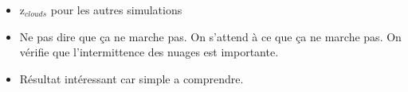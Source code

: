 \documentclass[10pt]{beamer}
\begin{document}
\begin{frame}
    \begin{itemize}
        \item z$_{clouds}$ pour les autres simulations 
        \item Ne pas dire que ça ne marche pas. On s'attend à ce que ça ne marche pas. On vérifie que l'intermittence des nuages est importante.
        \item Résultat intéressant car simple a comprendre.
    \end{itemize}
\end{frame}
\end{document}
